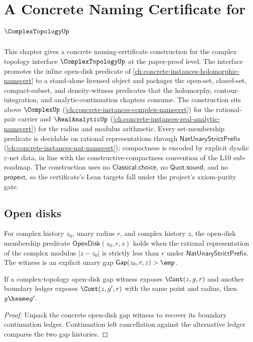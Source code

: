 \chapter{A Concrete Naming Certificate for \(\ComplexTopologyUp\)}
\label{ch:concrete-instances-complex-topology-namecert}

This chapter gives a concrete naming-certificate construction for the complex topology interface \(\ComplexTopologyUp\) at the paper-proof level. The interface promotes the inline open-disk predicate of \autoref{ch:concrete-instances-holomorphic-namecert} to a stand-alone licensed object and packages the open-set, closed-set, compact-subset, and density-witness predicates that the holomorphy, contour-integration, and analytic-continuation chapters consume. The construction sits above \(\ComplexUp\) (\autoref{ch:concrete-instances-complex-namecert}) for the rational-pair carrier and \(\RealAnalyticUp\) (\autoref{ch:concrete-instances-real-analytic-namecert}) for the radius and modulus arithmetic. Every set-membership predicate is decidable on rational representations through \(\mathsf{NatUnaryStrictPrefix}\) (\autoref{ch:concrete-instances-nat-namecert}); compactness is encoded by explicit dyadic \(\varepsilon\)-net data, in line with the constructive-compactness convention of the L10 sub-roadmap. The construction uses no \(\mathsf{Classical.choice}\), no \(\mathsf{Quot.sound}\), and no \(\mathsf{propext}\), so the certificate's Lean targets fall under the project's axiom-purity gate.

\section{Open disks}
\label{sec:cplx-topo-open-disks}

\begin{definition}
\label{def:cplx-topo-open-disk}
For complex history \(z_0\), unary radius \(r\), and complex history \(z\), the open-disk membership predicate \(\mathsf{OpenDisk}(z_0, r, z)\) holds when the rational representation of the complex modulus \(|z - z_0|\) is strictly less than \(r\) under \(\mathsf{NatUnaryStrictPrefix}\). The witness is an explicit unary gap \(\mathsf{Gap}(z_0, r, z) > \emp\).
\end{definition}

\begin{theorem}
\label{thm:cplx-topo-open-disk-gap-deterministic}
If a complex-topology open-disk gap witness exposes $\Cont(z,g,r)$ and another
boundary ledger exposes $\Cont(z,g',r)$ with the same point and radius, then
$g\hsame g'$.
\end{theorem}
\begin{proof}
Unpack the concrete open-disk gap witness to recover its boundary continuation
ledger. Continuation left cancellation against the alternative ledger compares
the two gap histories.
\end{proof}

